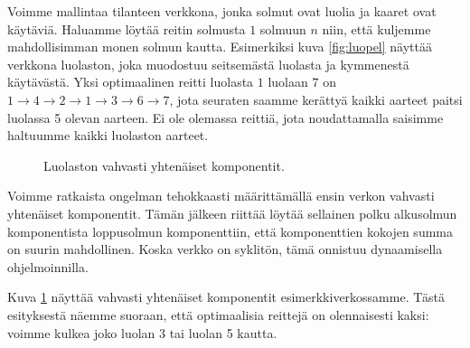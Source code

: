 Voimme mallintaa tilanteen verkkona, jonka solmut ovat luolia ja
kaaret ovat käytäviä. Haluamme löytää reitin solmusta $1$ solmuun $n$
niin, että kuljemme mahdollisimman monen solmun kautta.
Esimerkiksi kuva \ref{fig:luopel} näyttää verkkona luolaston, joka muodostuu
seitsemästä luolasta ja kymmenestä käytävästä.
Yksi optimaalinen reitti luolasta $1$ luolaan $7$ on
$1 \rightarrow 4 \rightarrow 2 \rightarrow 1 \rightarrow 3 \rightarrow 6 \rightarrow 7$,
jota seuraten saamme kerättyä kaikki aarteet paitsi luolassa 5 olevan aarteen.
Ei ole olemassa reittiä, jota noudattamalla saisimme haltuumme kaikki luolaston aarteet.

\begin{figure}
\center
\begin{center}
\end{center}
\caption{Luolaston vahvasti yhtenäiset komponentit.}
\label{fig:luovah}
\end{figure}

Voimme ratkaista ongelman tehokkaasti määrittämällä ensin verkon
vahvasti yhtenäiset komponentit.
Tämän jälkeen riittää löytää sellainen polku alkusolmun komponentista
loppusolmun komponenttiin, että komponenttien kokojen summa
on suurin mahdollinen.
Koska verkko on syklitön, tämä onnistuu dynaamisella ohjelmoinnilla.

Kuva \ref{fig:luovah} näyttää vahvasti yhtenäiset komponentit
esimerkkiverkossamme.
Tästä esityksestä näemme suoraan, että optimaalisia reittejä on olennaisesti kaksi:
voimme kulkea joko luolan 3 tai luolan 5 kautta.

